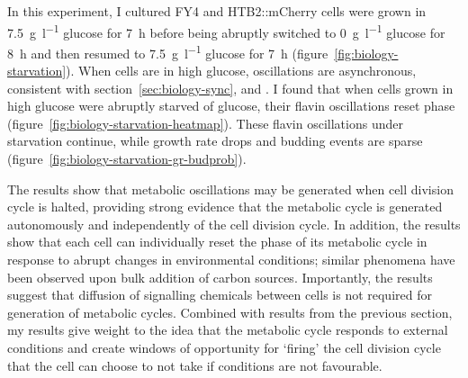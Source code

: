 In this experiment, I cultured FY4 and HTB2::mCherry cells were grown in \SI{7.5}{\gram~\litre^{-1}} glucose for \SI{7}{\hour} before being abruptly switched to \SI{0}{\gram~\litre^{-1}} glucose for \SI{8}{\hour} and then resumed to \SI{7.5}{\gram~\litre^{-1}} glucose for \SI{7}{\hour} (figure~\ref{fig:biology-starvation}).
When cells are in high glucose, oscillations are asynchronous, consistent with section~\ref{sec:biology-sync}, \textcite{papagiannakisAutonomousMetabolicOscillations2017} and \textcite{baumgartnerFlavinbasedMetabolicCycles2018}.
I found that when cells grown in high glucose were abruptly starved of glucose, their flavin oscillations reset phase (figure~\ref{fig:biology-starvation-heatmap}).
These flavin oscillations under starvation continue, while growth rate drops and budding events are sparse (figure~\ref{fig:biology-starvation-gr-budprob}).

The results show that metabolic oscillations may be generated when cell division cycle is halted, providing strong evidence that the metabolic cycle is generated autonomously and independently of the cell division cycle.
In addition, the results show that each cell can individually reset the phase of its metabolic cycle in response to abrupt changes in environmental conditions; similar phenomena have been observed upon bulk addition of carbon sources.
Importantly, the results suggest that diffusion of signalling chemicals between cells is not required for generation of metabolic cycles.
Combined with results from the previous section, my results give weight to the idea that the metabolic cycle responds to external conditions and create windows of opportunity for `firing' the cell division cycle that the cell can choose to not take if conditions are not favourable.


